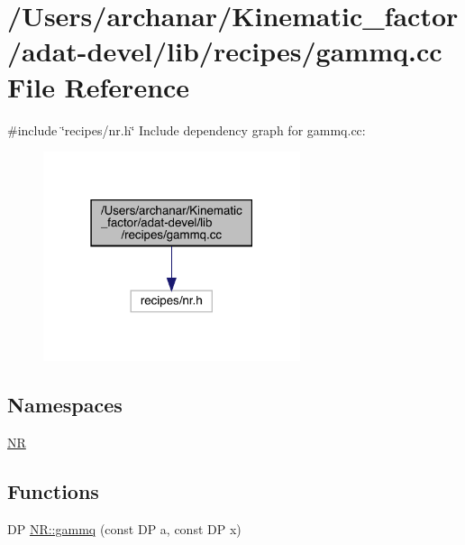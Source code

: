 \hypertarget{adat-devel_2lib_2recipes_2gammq_8cc}{}\section{/\+Users/archanar/\+Kinematic\+\_\+factor/adat-\/devel/lib/recipes/gammq.cc File Reference}
\label{adat-devel_2lib_2recipes_2gammq_8cc}
{\ttfamily \#include \char`\"{}recipes/nr.\+h\char`\"{}}\newline
Include dependency graph for gammq.\+cc\+:
\nopagebreak
\begin{figure}[H]
\begin{center}
\leavevmode
\includegraphics[width=214pt]{d8/d69/adat-devel_2lib_2recipes_2gammq_8cc__incl}
\end{center}
\end{figure}
\subsection*{Namespaces}
\begin{DoxyCompactItemize}
\item 
 \mbox{\hyperlink{namespaceNR}{NR}}
\end{DoxyCompactItemize}
\subsection*{Functions}
\begin{DoxyCompactItemize}
\item 
DP \mbox{\hyperlink{namespaceNR_aae834b3eabbd4eb103d876551fe4a8bf}{N\+R\+::gammq}} (const DP a, const DP x)
\end{DoxyCompactItemize}
